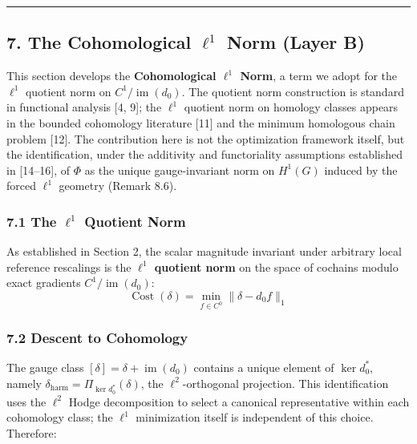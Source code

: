\documentclass[
]{article}
\begin{document}
\begin{center}\rule{0.5\linewidth}{0.5pt}\end{center}

\subsection{\texorpdfstring{7. The Cohomological \(\ell^1\) Norm
\textbf{(Layer
B)}}{7. The Cohomological \textbackslash ell\^{}1 Norm (Layer B)}}\label{the-cohomological-ell1-norm-layer-b}

This section develops the \textbf{Cohomological \(\ell^1\) Norm}, a term
we adopt for the \(\ell^1\) quotient norm on
\(C^1/\operatorname{im}(d_0)\). The quotient norm construction is
standard in functional analysis {[}4, 9{]}; the \(\ell^1\) quotient norm
on homology classes appears in the bounded cohomology literature
{[}11{]} and the minimum homologous chain problem {[}12{]}. The
contribution here is not the optimization framework itself, but the
identification, under the additivity and functoriality assumptions
established in {[}14--16{]}, of \(\Phi\) as the unique gauge-invariant
norm on \(H^1(G)\) induced by the forced \(\ell^1\) geometry (Remark
8.6).

\subsubsection{\texorpdfstring{7.1 The \(\ell^1\) Quotient
Norm}{7.1 The \textbackslash ell\^{}1 Quotient Norm}}\label{the-ell1-quotient-norm}

As established in Section 2, the scalar magnitude invariant under
arbitrary local reference rescalings is the \textbf{\(\ell^1\) quotient
norm} on the space of cochains modulo exact gradients
\(C^1 / \operatorname{im}(d_0)\):
\[ \operatorname{Cost}(\delta) = \min_{f \in C^0} \|\delta - d_0 f\|_1 \]

\subsubsection{7.2 Descent to Cohomology}\label{descent-to-cohomology}

The gauge class \([\delta] = \delta + \operatorname{im}(d_0)\) contains
a unique element of \(\ker d_0^*\), namely
\(\delta_{\text{harm}} = \Pi_{\ker d_0^*}(\delta)\), the
\(\ell^2\)-orthogonal projection. This identification uses the
\(\ell^2\) Hodge decomposition to select a canonical representative
within each cohomology class; the \(\ell^1\) minimization itself is
independent of this choice. Therefore:
\end{document}
